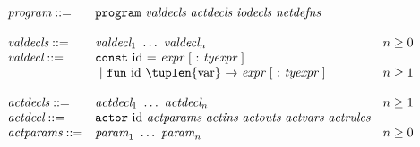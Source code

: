 \bigskip
$  \begin{array}{lll}
    \ut{program} ::= & \tm{program}~\ut{valdecls}~\ut{actdecls}~\ut{iodecls}~\ut{netdefns} & \\
    \\
    \ut{valdecls}   ::= & \ut{valdecl}_1~\ldots~\ut{valdecl}_n & n \geq 0 \\
    \ut{valdecl}  ::= & \tm{const}~\cat{id}~\tm{=}~\ut{expr}~[~\tm{:}~\ut{tyexpr}~] & \\
                      & ~|\ \tm{fun}~\cat{id}~\tuplen{\cat{var}} ~\tm{\rightarrow}~\ut{expr}~[~\tm{:}~\ut{tyexpr}~]  & n \geq 1\\
\\
    \ut{actdecls}   ::= & \ut{actdecl}_1~\ldots~\ut{actdecl}_n & n \geq 1 \\
    \ut{actdecl}  ::= & \tm{actor}~\cat{id}~\ut{actparams}~\ut{actins}~\ut{actouts}~\ut{actvars}~\ut{actrules} &\\
    \ut{actparams}   ::= & \ut{param}_1~\ldots~\ut{param}_n & n \geq 0 \\
  \end{array} $

